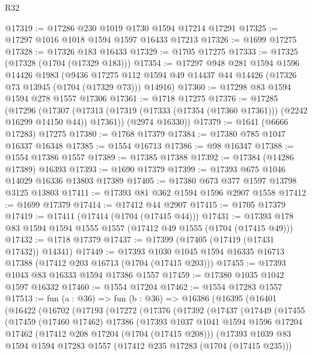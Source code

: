 \begin{lexlean}{R32}
\begin{coremodule}
@17319 := @17286 @230 @1019 @1730 @1594 @17214 @17291
@17325 := @17297 @1016 @1018 @1594 @1597 @16433 @17213
@17326 := @1699 @17275
@17328 := @17326 @183 @16433
@17329 := @1705 @17275
@17333 := @17325 (@17328 (@1704 (@17329 @183)))
@17354 := @17297
    @948
    @281
    @1594
    @1596
    @14426
    @1983
    (@9436 @17275 @112 @1594 @49 @14437 @44 @14426 (@17326 @73 @13945 (@1704 (@17329 @73))) @14916)
@17360 := @17298 @83 @1594 @1594 @278 @1557 @17306
@17361 := @1718 @17275
@17376 := @17285
    (@17296
      (@17307 (@17313 (@17319 (@17333 (@17354 (@17360 @17361))) (@2242 @16299 @14150 @44)) @17361))
      (@2974 @16330))
@17379 := @1641 (@6666 @17283) @17275
@17380 := @1768 @17379
@17384 := @17380 @785 @1047 @16337 @16348
@17385 := @1554 @16713
@17386 := @98 @16347
@17388 := @1554 @17386 @1557
@17389 := @17385 @17388
@17392 := @17384 (@14286 @17389) @16393
@17393 := @1690 @17379
@17399 := @17393 @675 @1046 @14029 @16336 @13803 @17389
@17405 := @17380 @673 @377 @1597 @13798 @3125 @13803
@17411 := @17393 @81 @362 @1594 @1596 @2907 @1558
@17412 := @1699 @17379
@17414 := @17412 @44 @2907
@17415 := @1705 @17379
@17419 := @17411 (@17414 (@1704 (@17415 @44)))
@17431 := @17393 @178 @83 @1594 @1594 @1555 @1557 (@17412 @49 @1555 (@1704 (@17415 @49)))
@17432 := @1718 @17379
@17437 := @17399 (@17405 (@17419 (@17431 @17432)) @14341)
@17449 := @17393 @1030 @1045 @1594 @16335 @16713 @17388 (@17412 @203 @16713 (@1704 (@17415 @203)))
@17455 := @17393 @1043 @83 @16333 @1594 @17386 @1557
@17459 := @17380 @1035 @1042 @1597 @16332
@17460 := @1554 @17204
@17462 := @1554 @17283 @1557
@17513 := fun (a : @36) =>
  fun (b : @36) =>
  @16386
    (@16395
      (@16401
        (@16422
          (@16702
            (@17193
              (@17272
                (@17376
                  (@17392
                    (@17437
                      (@17449
                        (@17455
                          (@17459
                            (@17460 @17462)
                            @17386
                            (@17393
                              @1037
                              @1041
                              @1594
                              @1596
                              @17204
                              @17462
                              (@17412 @208 @17204 (@1704 (@17415 @208)))
                              (@17393
                                @1039
                                @83
                                @1594
                                @1594
                                @17283
                                @1557
                                (@17412 @235 @17283 (@1704 (@17415 @235)))

\end{coremodule}
\end{lexlean}

